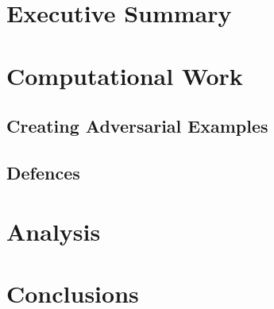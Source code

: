 \documentclass[conference]{IEEEtran}
\begin{document}
\tableofcontents%

\bigskip 

\section{Executive Summary}

\section{Computational Work}

\subsection{Creating Adversarial Examples}

\subsection{Defences}

\section{Analysis}

\section{Conclusions}



\end{document}
